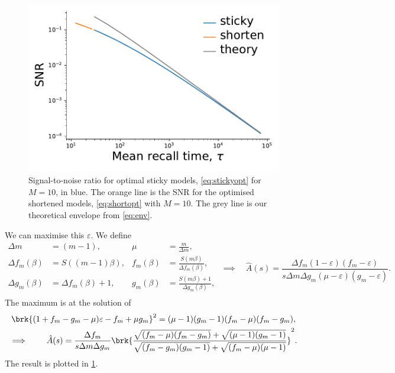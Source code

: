 \documentclass[12pt]{article}
\begin{document}
\begin{figure}[ht]
\begin{center}
  \includegraphics[width=0.4\linewidth]{sticky_opt.pdf}
\caption[Signal-to-noise ratio for optimal sticky models]
{Signal-to-noise ratio for optimal sticky models, \cref{eq:stickyopt} for \(M=10\), in blue.
  The orange line is the SNR for the optimised shortened models, \cref{eq:shortopt} with \(M=10\).
  The grey line is our theoretical envelope from \cref{eq:env}.
  \label{fig:sticky}}
\end{center}
\end{figure}

We can maximise this \wrt \(\varepsilon\).
We define
%
\begin{equation*}
\begin{aligned}
  \Delta m &= (m-1), &
  \mu &= \frac{m}{\Delta m}, \\
  \Delta f_m(\beta) &= S((m-1)\beta), &
  f_m(\beta) &= \frac{S(m\beta)}{\Delta f_m(\beta)}, \\
  \Delta g_m(\beta) &= \Delta f_m(\beta) + 1 , &
  g_m(\beta) &= \frac{S(m\beta) + 1}{\Delta g_m(\beta)}, \\
\end{aligned}
 \; \implies \quad
 \hat{A}(s) = \frac{\Delta f_m (1 - \varepsilon) (f_m - \varepsilon)}
                    {s \Delta m \Delta g_m (\mu - \varepsilon) (g_m - \varepsilon)}.
\end{equation*}
%
The maximum is at the solution of
%
\begin{multline}\label{eq:stickyopt}
  \brk{(1 + f_m -  g_m - \mu)\varepsilon - f_m + \mu g_m}^2 
    = (\mu - 1) (g_m - 1) (f_m - \mu) (f_m - g_m) , \\
  \implies \qquad
  \hat{A}(s) = \frac{\Delta f_m}{s \Delta m \Delta g_m}
                \brk{\frac{\sqrt{(f_m - \mu)(f_m - g_m)} + \sqrt{(\mu - 1)(g_m - 1)}}
                          {\sqrt{(f_m - g_m)(g_m - 1)} + \sqrt{(f_m - \mu)(\mu - 1)}}}^2.
\end{multline}
%
The result is plotted in \cref{fig:sticky}.
\end{document}
